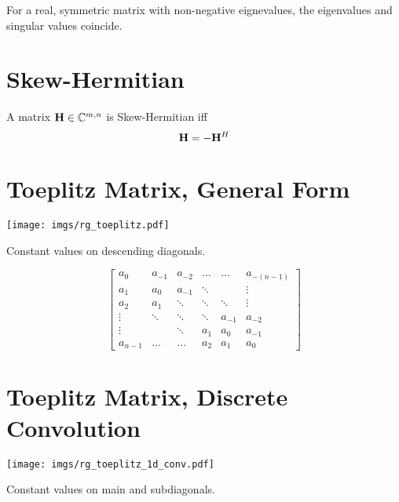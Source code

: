 For a real, symmetric matrix with non-negative eignevalues, the eigenvalues and singular values coincide.



\section{Skew-Hermitian}
A matrix $\mathbf{H}\in\mathbb{C}^{m,n}$ is Skew-Hermitian iff
\begin{equation}
\mathbf{H}=-\mathbf{H}^H
\end{equation}



\section{Toeplitz Matrix, General Form}

\begin{center}
\texttt{[image: imgs/rg\_toeplitz.pdf]}
\end{center}


Constant values on descending diagonals.

\begin{equation}
\begin{bmatrix}
  a_{0} & a_{-1} & a_{-2} & \ldots  & \ldots & a_{-(n-1)}  \\
  a_{1} & a_0    & a_{-1} & \ddots  &        & \vdots \\
  a_{2} & a_{1}  & \ddots & \ddots  & \ddots & \vdots \\ 
 \vdots & \ddots & \ddots & \ddots  & a_{-1} & a_{-2}\\
 \vdots &        & \ddots & a_{1}   & a_{0}  & a_{-1} \\
a_{n-1} & \ldots & \ldots & a_{2}   & a_{1}  & a_{0}
\end{bmatrix}
\end{equation}


\section{Toeplitz Matrix, Discrete Convolution}

\begin{center}
\texttt{[image: imgs/rg\_toeplitz\_1d\_conv.pdf]}
\end{center}

Constant values on main and subdiagonals.

